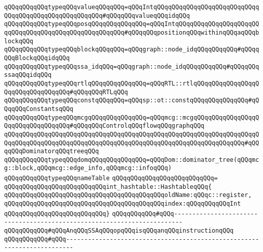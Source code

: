 \verb|qQQqqQQqqQQqtypeqQQqvalueqQQqqQQq=qQQqIntqQQqqQQqqQQqqQQqqQQqqQQqqQQqqQQqqQQqqQQqqQQqqQQqqQQqqQQq#qQQqqQQqvalueqQQqidqQQq|\newline
\verb|qQQqqQQqqQQqtypeqQQqposqQQqqQQqqQQqqQQq=qQQqIntqQQqqQQqqQQqqQQqqQQqqQQqqQQqqQQqqQQqqQQqqQQqqQQqqQQqqQQq#qQQqqQQqpositionqQQqwithinqQQqaqQQqblockqQQq|\newline
\verb|qQQqqQQqqQQqtypeqQQqblockqQQqqQQq=qQQqgraph::node_idqQQqqQQqqQQq#qQQqqQQqBlockqQQqidqQQq|\newline
\verb|qQQqqQQqqQQqtypeqQQqssa_idqQQq=qQQqgraph::node_idqQQqqQQqqQQq#qQQqqQQqssaqQQqidqQQq|\newline
\verb|qQQqqQQqqQQqtypeqQQqrtlqQQqqQQqqQQqqQQq=qQQqRTL::rtlqQQqqQQqqQQqqQQqqQQqqQQqqQQqqQQqqQQq#qQQqqQQqRTLqQQq|\newline
\verb|qQQqqQQqqQQqtypeqQQqconstqQQqqQQq=qQQqsp::ot::constqQQqqQQqqQQqqQQq#qQQqqQQqConstantsqQQq|\newline
\verb|qQQqqQQqqQQqtypeqQQqmcgqQQqqQQqqQQqqQQq=qQQqmcg::mcgqQQqqQQqqQQqqQQqqQQqqQQqqQQqqQQqqQQq#qQQqqQQqControlqQQqflowqQQqgraphqQQq|\newline
\verb|qQQqqQQqqQQqqQQqqQQqqQQqqQQqqQQqqQQqqQQqqQQqqQQqqQQqqQQqqQQqqQQqqQQqqQQqqQQqqQQqqQQqqQQqqQQqqQQqqQQqqQQqqQQqqQQqqQQqqQQqqQQqqQQqqQQqqQQq#qQQqqQQqDominatorqQQqtreeqQQq|\newline
\verb|qQQqqQQqqQQqtypeqQQqdomqQQqqQQqqQQqqQQq=qQQqDom::dominator_tree(qQQqmcg::block,qQQqmcg::edge_info,qQQqmcg::infoqQQq)|\newline
\newline
\verb|qQQqqQQqqQQqtypeqQQqnameTable|\newline
\verb|qQQqqQQqqQQqqQQqqQQqqQQqqQQq=|\newline
\verb|qQQqqQQqqQQqqQQqqQQqqQQqqQQqint_hashtable::HashtableqQQq{|\newline
\newline
\verb|qQQqqQQqqQQqqQQqqQQqqQQqqQQqqQQqqQQqqQQqqQQqoldName:qQQqc::register,|\newline
\verb|qQQqqQQqqQQqqQQqqQQqqQQqqQQqqQQqqQQqqQQqqQQqindex:qQQqqQQqqQQqInt|\newline
\verb|qQQqqQQqqQQqqQQqqQQqqQQqqQQq}|\newline
\newline
\verb|qQQqqQQqqQQq#qQQq------------------------------------------------------------------------|\newline
\verb|qQQqqQQqqQQq#qQQqAnqQQqSSAqQQqopqQQqisqQQqanqQQqinstructionqQQq|\newline
\verb|qQQqqQQqqQQq#qQQq------------------------------------------------------------------------|\newline
